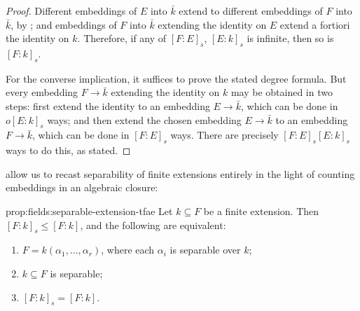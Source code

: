 \begin{proof}
  Different embeddings of $E$ into $\bar{k}$ extend to different
  embeddings of $F$ into $\bar{k}$, by ; and
  embeddings of $F$ into $\bar{k}$ extending the identity on $E$
  extend a fortiori the identity on $k$. Therefore, if any of
  ${[F : E]}_s$, ${[E : k]}_s$ is infinite, then so is ${[F : k]}_s$.

  For the converse implication, it suffices to prove the stated degree
  formula. But every embedding $F \to \bar{k}$ extending the identity
  on $k$ may be obtained in two steps: first extend the identity to an
  embedding $E \to \bar{k}$, which can be done in ${o[E : k]}_s$ ways;
  and then extend the chosen embedding $E \to \bar{k}$ to an embedding
  $F \to \bar{k}$, which can be done in ${[F : E]}_s$ ways. There are
  precisely ${[F : E]}_s {[E : k]}_s$ ways to do this, as stated.
\end{proof}
 allow us to recast separability
of finite extensions entirely in the light of counting embeddings in
an algebraic closure:
\begin{prop}{}{prop:fields:separable-extension-tfae}
  Let $k \subseteq F$ be a finite extension. Then
  $[F : k]_s \leq [F : k]$, and the following are equivalent:
  \begin{enumerate}[label=(\roman*)]
  \item $F = k(\alpha_1, \dots, \alpha_r)$, where each $\alpha_i$ is
    separable over $k$;
  \item $k \subseteq F$ is separable;
  \item ${[F : k]}_s = {[F : k]}$.
  \end{enumerate}
\end{prop}
